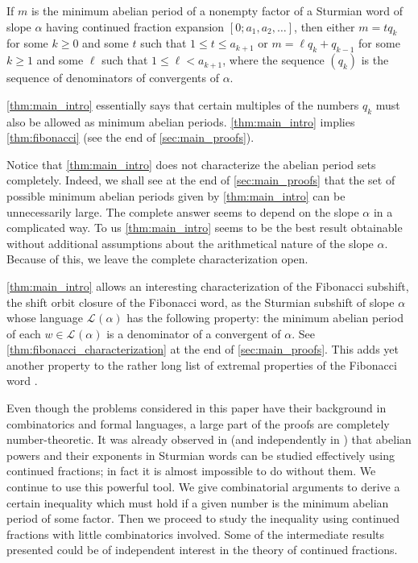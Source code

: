 \documentclass[a4paper,fleqn]{article}
\newcommand{\Lang}[2][]{\mathcal{L}_{#1}(#2)}
\begin{document}
  \begin{theorem}\label{thm:main_intro}
    If $m$ is the minimum abelian period of a nonempty factor of a Sturmian word of slope $\alpha$ having continued
    fraction expansion $[0; a_1, a_2, \ldots]$, then either $m = tq_k$ for some $k \geq 0$ and some $t$ such that
    $1 \leq t \leq a_{k+1}$ or $m = \ell q_k + q_{k-1}$ for some $k \geq 1$ and some $\ell$ such that
    $1 \leq \ell < a_{k+1}$, where the sequence $(q_k)$ is the sequence of denominators of convergents of $\alpha$.
  \end{theorem}

  \autoref{thm:main_intro} essentially says that certain multiples of the numbers $q_k$ must also be allowed as minimum
  abelian periods. \autoref{thm:main_intro} implies \autoref{thm:fibonacci} (see the end of \autoref{sec:main_proofs}).

  Notice that \autoref{thm:main_intro} does not characterize the abelian period sets completely. Indeed, we shall see
  at the end of \autoref{sec:main_proofs} that the set of possible minimum abelian periods given by
  \autoref{thm:main_intro} can be unnecessarily large. The complete answer seems to depend on the slope $\alpha$ in a
  complicated way. To us \autoref{thm:main_intro} seems to be the best result obtainable without additional assumptions
  about the arithmetical nature of the slope $\alpha$. Because of this, we leave the complete characterization open.

  \autoref{thm:main_intro} allows an interesting characterization of the Fibonacci subshift, the shift orbit closure of
  the Fibonacci word, as the Sturmian subshift of slope $\alpha$ whose language $\Lang{\alpha}$ has the following
  property: the minimum abelian period of each $w \in \Lang{\alpha}$ is a denominator of a convergent of $\alpha$. See
  \autoref{thm:fibonacci_characterization} at the end of \autoref{sec:main_proofs}. This adds yet another property to
  the rather long list of extremal properties of the Fibonacci word
  \cite{2008:on_extremal_properties_of_the_fibonacci_word,2013:some_extremal_properties_of_the_fibonacci_word,2014:lyndon_words_and_fibonacci_numbers}.

  Even though the problems considered in this paper have their background in combinatorics and formal languages, a
  large part of the proofs are completely number-theoretic. It was already observed in
  \cite{2016:abelian_powers_and_repetitions_in_sturmian_words} (and independently in
  \cite{2013:some_properties_of_abelian_return_words}) that abelian powers and their exponents in Sturmian words can be
  studied effectively using continued fractions; in fact it is almost impossible to do without them. We continue to use
  this powerful tool. We give combinatorial arguments to derive a certain inequality which must hold if a given number
  is the minimum abelian period of some factor. Then we proceed to study the inequality using continued fractions with
  little combinatorics involved. Some of the intermediate results presented could be of independent interest in the
  theory of continued fractions.
\end{document}
